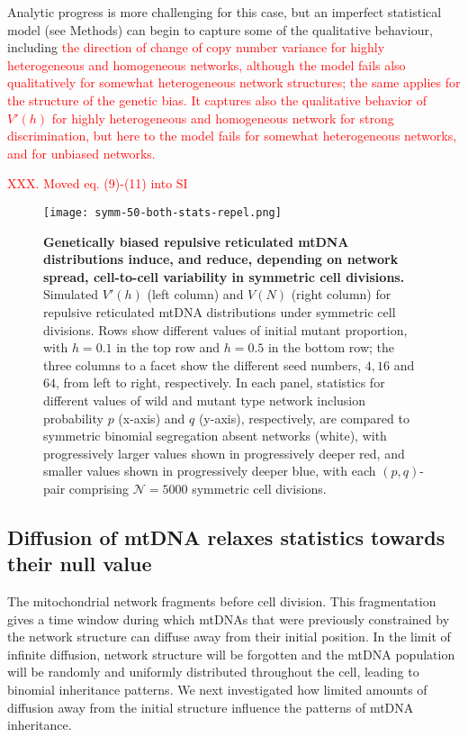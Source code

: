 \documentclass{article}
\begin{document}
Analytic progress is more challenging for this case, but an imperfect statistical model (see Methods) can begin to capture some of the qualitative behaviour, including \textcolor{red}{the direction of change of copy number variance for highly heterogeneous and homogeneous networks, although the model fails also qualitatively for somewhat heterogeneous network structures; the same applies for the structure of the genetic bias. It captures also the qualitative behavior of $V'(h)$ for highly heterogeneous and homogeneous network for strong discrimination, but here to the model fails for somewhat heterogeneous networks, and for unbiased networks.}

\textcolor{red}{XXX. Moved eq. (9)-(11) into SI}

\begin{figure}
\centering
\texttt{[image: symm-50-both-stats-repel.png]}
\caption{\textbf{Genetically biased repulsive reticulated mtDNA distributions induce, and reduce, depending on network spread, cell-to-cell variability in symmetric cell divisions.} Simulated $V'(h)$ (left column) and $V(N)$ (right column) for repulsive reticulated mtDNA distributions under symmetric cell divisions. Rows show different values of initial mutant proportion, with $h=0.1$ in the top row and $h=0.5$ in the bottom row; the three columns to a facet show the different seed numbers, $4, 16$ and $64$, from left to right, respectively. In each panel, statistics for different values of wild and mutant type network inclusion probability $p$ (x-axis) and $q$ (y-axis), respectively, are compared to symmetric binomial segregation absent networks (white), with progressively larger values shown in progressively deeper red, and smaller values shown in progressively deeper blue, with each $(p,q)$-pair comprising $\mathcal{N}=5000$ symmetric cell divisions.}\label{fig:sim-model-compare-rep}
\end{figure}


\subsection{Diffusion of mtDNA relaxes statistics towards their null value}
The mitochondrial network fragments before cell division. This fragmentation gives a time window during which mtDNAs that were previously constrained by the network structure can diffuse away from their initial position. In the limit of infinite diffusion, network structure will be forgotten and the mtDNA population will be randomly and uniformly distributed throughout the cell, leading to binomial inheritance patterns. We next investigated how limited amounts of diffusion away from the initial structure influence the patterns of mtDNA inheritance.
\end{document}
